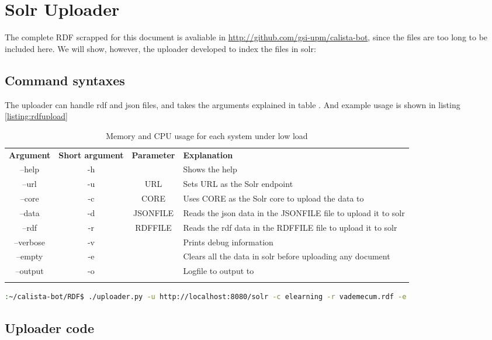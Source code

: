 \chapter{Solr Uploader}

The complete RDF scrapped for this document is avaliable in \url{http://github.com/gsi-upm/calista-bot}, since the files are too long to be included here. We will show, however, the uploader developed to index the files in solr:

\section{Command syntaxes}

The uploader can handle rdf and json files, and takes the arguments explained in table . And example usage is shown in listing \ref{listing:rdfupload}

\begin{table}
  \centering
  \begin{tabular*}{0.7\textwidth}{| c | c | c | p{} |}
    \hhline{|-|-|-|-|}
    \textbf{Argument} & \textbf{Short argument} & \textbf{Parameter}& \textbf{Explanation} \\ \hhline{|=|=|=|=|}
    --help & -h &  & Shows the help\\ \hhline{|-|-|-|-|} 
    --url & -u & URL & Sets URL as the Solr endpoint \\ \hhline{|-|-|-|-|} 
    --core & -c & CORE & Uses CORE as the Solr core to upload the data to\\ \hhline{|-|-|-|-|} 
    --data & -d & JSONFILE & Reads the json data in the JSONFILE file to upload it to solr\\ \hhline{|-|-|-|-|} 
    --rdf & -r & RDFFILE & Reads the rdf data in the RDFFILE file to upload it to solr \\ \hhline{|-|-|-|-|} 
    --verbose & -v & & Prints debug information \\ \hhline{|-|-|-|-|} 
    --empty & -e & & Clears all the data in solr before uploading any document \\ \hhline{|-|-|-|-|} 
    --output & -o & & Logfile to output to \\ \hhline{|-|-|-|-|} 
    \end{tabular*}
  \caption{Memory and CPU usage for each system under low load}
  \label{tab:loadmeasures}
\end{table}


\begin{center} 
  \begin{lstlisting}[language=bash, captionpos=b, caption=Example command to upload the vademecum data into Solr, label=listing:rdfupload]
  :~/calista-bot/RDF$ ./uploader.py -u http://localhost:8080/solr -c elearning -r vademecum.rdf -e
  \end{lstlisting}
\end{center}

\section{Uploader code}

\begin{center}
  
\end{center}
